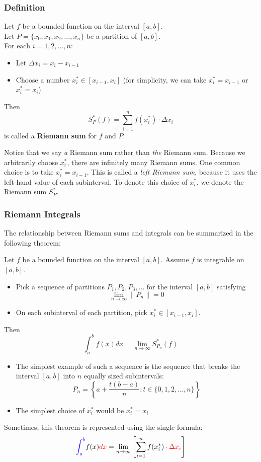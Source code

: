 \documentclass[11pt]{article}
\newenvironment{definition}[1][]{\begin{tcolorbox}[colframe=_orange,colback=_orange2,title=Definition. \ifthenelse{\isempty{#1}}{}{(#1)}
]}{\end{tcolorbox}}
\newenvironment{theorem}[1][]{\begin{tcolorbox}[colframe=_blue,colback=_blue2,title=Theorem. \ifthenelse{\isempty{#1}}{}{(#1)}
]}{\end{tcolorbox}}
\newcommand\norm[1]{\left\lVert#1\right\rVert}
\newcommand{\hr}{\noindent\makebox[\linewidth]{\rule{\textwidth}{0.4pt}}\par\vspace{0.1in}}
\begin{document}
\subsubsection{Definition}
\begin{definition}
    Let $f$ be a bounded function on the interval $[a,b]$. \\
    Let $P=\{x_0,x_1,x_2,\dots,x_n\}$ be a partition of $[a,b]$. \\
    For each $i=1,2,\dots,n$:
    \begin{itemize}
        \item Let $\Delta x_i=x_i-x_{i-1}$
        \item Choose a number $x_i^*\in[x_{i-1},x_i]$ (for simplicity, we can take $x_i^*=x_{i-1}$ or $x_i^*=x_i$)
    \end{itemize}
    Then
    $$
        S_P^*(f)=\sum_{i=1}^nf(x_i^*)\cdot\Delta x_i
    $$
    is called a \textbf{Riemann sum} for $f$ and $P$.
\end{definition}
Notice that we say \textit{a} Riemann sum rather than \textit{the} Riemann sum. Because we arbitrarily choose $x_i^*$, there are infinitely many Riemann sums. One common choice is to take $x_i^*=x_{i-1}$. This is called a \textit{left Riemann sum}, because it uses the left-hand value of each subinterval. To denote this choice of $x_i^*$, we denote the Riemann sum $S_P^*$.
\subsubsection{Riemann Integrals}
The relationship between Riemann sums and integrals can be summarized in the following theorem:
\begin{theorem}
    Let $f$ be a bounded function on the interval $[a,b]$. Assume $f$ is integrable on $[a,b]$.
    \begin{itemize}
        \item Pick a sequence of partitions $P_1,P_2,P_3,\dots$ for the interval $[a,b]$ satisfying
        $$
            \lim_{n\to\infty}\norm{P_n}=0
        $$
        \item On each subinterval of each partition, pick $x_i^*\in[x_{i-1},x_i]$. \\
    \end{itemize}
    Then
    $$
        \int_a^b f(x)dx=\lim_{n\to\infty} S_{P_n}^*(f)
    $$
    \hr
    \begin{itemize}
        \item The simplest example of such a sequence is the sequence that breaks the interval $[a,b]$ into $n$ equally sized subintervals:
        $$
            P_n=\left\{a+\frac{t(b-a)}{n}:t\in\{0,1,2,\dots,n\}\right\}
        $$
        \item The simplest choice of $x_i^*$ would be $x_i^*=x_i$
    \end{itemize}
\end{theorem}
Sometimes, this theorem is represented using the single formula:
$$
    \textcolor{blue}{\int_a^b} f(x)\textcolor{red}{dx}=\lim_{n\to\infty}\left[\sum_{i=1}^n f(x_i^*)\cdot\textcolor{red}{\Delta x_i}\right]
$$
\end{document}
